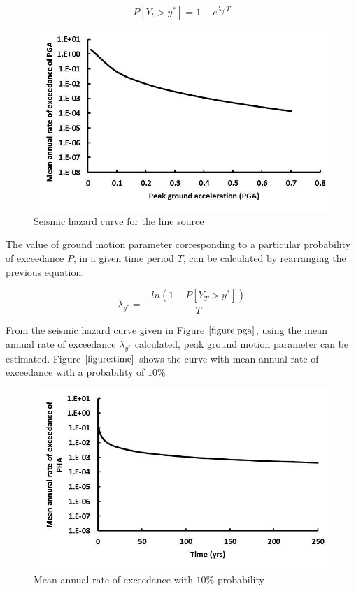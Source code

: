 \documentclass[a4paper,english,12pt]{article}
\begin{document}
$$P[Y_t>y^*] = 1 - e^{\lambda_{y^*}T}$$

\begin{figure}[h!]
\graphicspath{ {images/} }
\includegraphics[width=\textwidth]{pga}
\caption{Seismic hazard curve for the line source}
\label{figure:pga}
\centering
\end{figure}

The value of ground motion parameter corresponding to a particular probability of exceedance $P$, in a given time period $T$, can be calculated by rearranging the previous equation.

$$\lambda _{y^*} = -\frac{ln(1 - P[Y_T > y^*])}{T}$$

From the seismic hazard curve given in Figure $\ref{figure:pga}$, using the mean annual rate of exceedance $\lambda _{y^*}$ calculated, peak ground motion parameter can be estimated. Figure $\ref{figure:time}$ shows the curve with mean annual rate of exceedance with a probability of $10\%$

\begin{figure}[h!]
\graphicspath{ {images/} }
\includegraphics[width=\textwidth]{time}
\caption{Mean annual rate of exceedance with $10\%$ probability}
\label{figure:time}
\centering
\end{figure}
\end{document}
